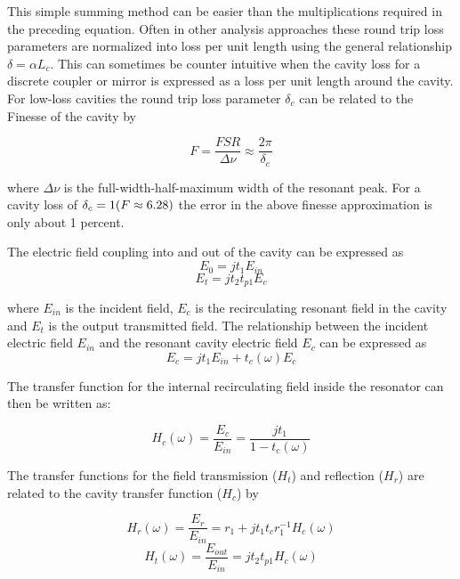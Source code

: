 \documentclass[10pt]{article}
\begin{document}
\noindent  This simple summing method can be easier than the multiplications  required in the preceding equation.  Often in other analysis approaches these round trip loss parameters are normalized into loss per unit length using the general relationship $\delta = \alpha L_c $.  This can sometimes be counter intuitive when the cavity loss for a discrete coupler or mirror is expressed as a loss per unit length around the cavity.   For low-loss cavities the round trip loss parameter $\delta_c$ can be related to  the Finesse of the cavity by 

\begin{equation} 
F = \frac{FSR}{\Delta\nu}  \approx \frac{2\pi}{\delta_c} 
\label{eq:F}
\end{equation}  

\noindent where $\Delta\nu$ is the full-width-half-maximum width of the resonant peak.
For a cavity loss of $ \delta_c = 1 \space (F \approx 6.28) $ the error in the above finesse approximation is only about 1 percent.


The electric field coupling into and out of the cavity can be expressed as
\begin{equation} E_0 = j t_1 E_{in} \end{equation}
\begin{equation} E_{t} = j t_2 t_{p1} E_c \end{equation}

\noindent      where $E_{in}$ is the incident field, $E_{c}$ is the recirculating resonant field in the cavity and $E_t$ is the output transmitted field.    The relationship between the incident electric field $E_{in}$ and the resonant cavity electric field $E_c$ can be expressed as
\begin{equation} E_c = jt_1E_{in}+t_c(\omega)E_c  \end{equation}  

\noindent  The transfer function for the internal recirculating field inside the resonator can then be written as:

\begin{equation}
\boxed{H_c(\omega) = \frac{E_{c}}{E_{in}} = \frac{jt_1}{1-t_c(\omega)}}      
\label{eq:Hc}
\end{equation}
 
 

The transfer functions for the field transmission ($H_t$) and reflection ($H_r$) are related to the cavity transfer function ($H_c$) by


\begin{equation} 
H_r(\omega) = \frac{E_{r}}{E_{in}} = r_1 + j t_1 t_c r_1^{-1} H_c(\omega) 
\label{eq:Hr}
\end{equation}
\begin{equation} 
H_t(\omega) = \frac{E_{out}}{E_{in}} = j t_2 t_{p1} H_c(\omega)
\label{eq:Ht} 
\end{equation}
\end{document}
